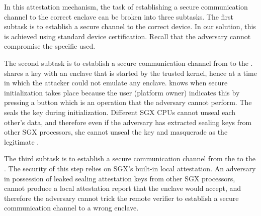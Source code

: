 In this attestation mechanism, the task of establishing a secure communication channel to the correct enclave can be broken into three subtasks. The first subtask is to establish a secure channel to the correct \device device. In our solution, this is achieved using standard device certification. Recall that the adversary cannot compromise the specific \device used. 

The second subtask is to establish a secure communication channel from \device to the \nameclave. 
\device shares a key with an enclave that is started by the trusted \name kernel, hence at a time in which the attacker could not emulate any enclave. \device knows when secure initialization takes place because the user (platform owner) indicates this by pressing a button which is an operation that the adversary cannot perform. The \nameclave seals the key during initialization. Different SGX CPUs cannot unseal each other's data, and therefore even if the adversary has extracted sealing keys from other SGX processors, she cannot unseal the key and masquerade as the legitimate \nameclave. %

The third subtask is to establish a secure communication channel from the \nameclave to the \app. The security of this step relies on SGX's built-in local attestation. An adversary in possession of leaked sealing attestation keys from other SGX processors, cannot produce a local attestation report that the \name enclave would accept, and therefore the adversary cannot trick the remote verifier to establish a secure communication channel to a wrong enclave.

\iffalse
\subsection{TCB and Attack Surface}

Figure~\ref{fig:TOFU} illustrates a comparison of trusted components and attack surface between a TOFU solution where a trusted authority (CA) certifies enclave keys (cf.~Section~\ref{sec:problemStatement:limitations}) and our hardened attestation mechanisms. In such TOFU solution, the TCB consists of the target platform hardware, the OS that needs to be trusted only at the time of first use, and a standard certification authority (CA). In our Variant I (distance-bounding), the TCB contains the target platform hardware, the embedded device (\device), and a CA that can be entirely offline. The OS is untrusted. In our Variant II (boot-time initialization), the TCB contains the target platform hardware, the embedded device, an offline CA and a small kernel that needs to be trusted at the time of first use. This small kernel requires no network functionality, and thus this component can be considered offline.
\fi

